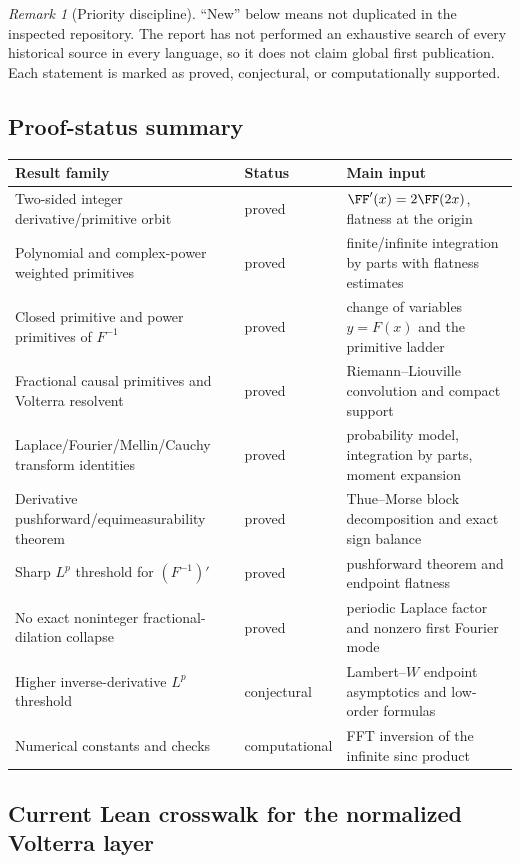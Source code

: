 \documentclass[11pt,oneside]{article}
\theoremstyle{definition}
\theoremstyle{remark}
\newtheorem{remark}[theorem]{Remark}
\newcommand{\1}{\mathbf 1}
\begin{document}
\begin{remark}[Priority discipline]
``New'' below means not duplicated in the inspected repository.  The report has not
performed an exhaustive search of every historical source in every language, so it does
not claim global first publication.  Each statement is marked as proved, conjectural,
or computationally supported.
\end{remark}

\subsection{Proof-status summary}

\begin{longtable}{p{}p{}p{}}
\toprule
Result family & Status & Main input \\
\midrule
\endhead
Two-sided integer derivative/primitive orbit & proved &
\(\FF'(x)=2\FF(2x)\), flatness at the origin \\
Polynomial and complex-power weighted primitives & proved &
finite/infinite integration by parts with flatness estimates \\
Closed primitive and power primitives of \(F^{-1}\) & proved &
change of variables \(y=F(x)\) and the primitive ladder \\
Fractional causal primitives and Volterra resolvent & proved &
Riemann--Liouville convolution and compact support \\
Laplace/Fourier/Mellin/Cauchy transform identities & proved &
probability model, integration by parts, moment expansion \\
Derivative pushforward/equimeasurability theorem & proved &
Thue--Morse block decomposition and exact sign balance \\
Sharp \(L^p\) threshold for \((F^{-1})'\) & proved &
pushforward theorem and endpoint flatness \\
No exact noninteger fractional-dilation collapse & proved &
periodic Laplace factor and nonzero first Fourier mode \\
Higher inverse-derivative \(L^p\) threshold & conjectural &
Lambert--\(W\) endpoint asymptotics and low-order formulas \\
Numerical constants and checks & computational &
FFT inversion of the infinite sinc product \\
\bottomrule
\end{longtable}

\subsection{Current Lean crosswalk for the normalized Volterra layer}
\end{document}
